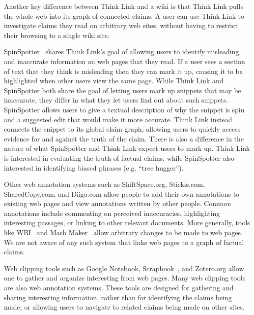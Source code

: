 \documentclass{chi2009}
\begin{document}
Another key difference between Think Link and a wiki is that Think Link pulls the whole web into its graph of connected claims. A user can use Think Link to investigate claims they read on arbitrary web sites, without having to restrict their browsing to a single wiki site.

SpinSpotter~\cite{spinspotter} shares Think Link's goal of allowing users to identify misleading and inaccurate information on web pages that they read. If a user sees a section of text that they think is misleading then they can mark it up, causing it to be highlighted when other users view the same page. While Think Link and SpinSpotter both share the goal of letting users mark up snippets that may be inaccurate, they differ in what they let users find out about such snippets. SpinSpotter allows users to give a textual description of why the snippet is spin and a suggested edit that would make it more accurate. Think Link instead connects the snippet to its global claim graph, allowing users to quickly access evidence for and against the truth of the claim. There is also a difference in the nature of what SpinSpotter and Think Link expect users to mark up. Think Link is interested in evaluating the truth of factual claims, while SpinSpotter also interested in identifying biased phrases (e.g. ``tree hugger'').

Other web annotation systems such as ShiftSpace.org, Stickis.com, SharedCopy.com, and Diigo.com allow people to add their own annotations to existing web pages and view annotations written by other people. Common annotations include commenting on perceived inaccuracies, highlighting interesting passages, or linking to other relevant documents. More generally, tools like WBI~\cite{personalweb} and Mash Maker~\cite{mashmaker} allow arbitrary changes to be made to web pages. We are not aware of any such system that links web pages to a graph of factual claims. 


Web clipping tools such as Google Notebook, Scrapbook~\cite{scrapbook}, and Zotero.org allow one to gather and organize interesting from web pages. Many web clipping tools are also web annotation systems. These tools are designed for gathering and sharing interesting information, rather than for identifying the claims being made, or allowing users to navigate to related claims being made on other sites.
\end{document}
